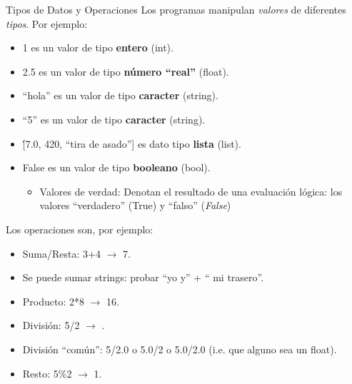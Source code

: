 \documentclass{beamer}
\begin{document}
\begin{frame}{Tipos de Datos y Operaciones}
Los programas manipulan \emph{valores} de diferentes \emph{tipos}. Por ejemplo:
\begin{itemize}
	\item 1 es un valor de tipo \textbf{entero} (int).\pause
	\item 2.5 es un valor de tipo \textbf{número ``real''} (float).\pause
	\item ``hola'' es un valor de tipo \textbf{caracter} (string).\pause
	\item ``5'' es un valor de tipo \textbf{caracter} (string).\pause
	\item \'[7.0, 420, “tira de asado”] es dato tipo \textbf{lista} (list).\pause	
	\item False es un valor de tipo \textbf{booleano} (bool).\pause


\begin{itemize}
\item Valores de verdad: Denotan el resultado de una evaluación lógica: los valores “verdadero” (True) y “falso” (\emph{False})
\end{itemize}
\end{itemize}

Los operaciones son, por ejemplo:
\begin{itemize}
	\item Suma/Resta: 3+4 $\to$ 7.\pause
	\item Se puede sumar strings: probar ``yo y'' + `` mi trasero''.\pause
	\item Producto: 2*8 $\to$ 16.\pause
	\item División: 5/2 $\to$ . 
	\item División ``común'': 5/2.0 o 5.0/2 o 5.0/2.0 (i.e. que alguno sea un float).\pause
	\item Resto: 5\%2 $\to$ 1.
\end{itemize}
\end{frame}
\end{document}

